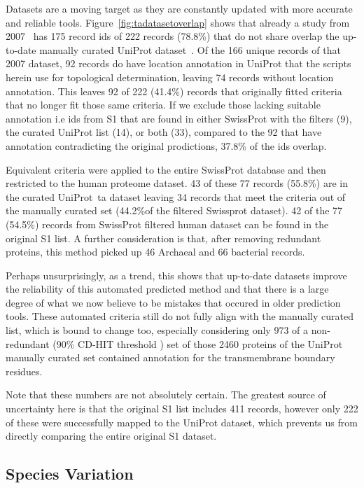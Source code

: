 Datasets are a moving target as they are constantly updated with more accurate and reliable tools.
Figure~\ref{fig:tadatasetoverlap} shows that already a study from 2007~\cite{Kalbfleisch2007} has 175 record ids of 222 records (78.8\%) that do not share overlap the up-to-date manually curated UniProt dataset~\cite{TheUniProtConsortium2014}.
Of the 166 unique records of that 2007 dataset, 92 records do have location annotation in UniProt that the scripts herein use for topological determination, leaving 74 records without location annotation.
This leaves 92 of 222 (41.4\%) records that originally fitted criteria that no longer fit those same criteria.
If we exclude those lacking suitable annotation i.e ids from S1 that are found in either SwissProt with the filters (9), the curated UniProt list (14), or both (33), compared to the 92 that have annotation contradicting the original prodictions, 37.8\% of the ids overlap.

Equivalent criteria were applied to the entire SwissProt database and then restricted to the human proteome dataset.
43 of these 77 records (55.8\%) are in the curated UniProt~\gls{ta}  dataset leaving 34 records that meet the criteria out of the manually curated set (44.2\%of the filtered Swissprot dataset).
42 of the 77 (54.5\%) records from SwissProt filtered human dataset can be found in the original S1 list.
A further consideration is that, after removing redundant proteins, this method picked up  46 Archaeal and 66 bacterial records.

Perhaps unsurprisingly, as a trend, this shows that up-to-date datasets improve the reliability of this automated predicted method and that there is a large degree of what we now believe to be mistakes that occured in older prediction tools.
These automated criteria still do not fully align with the manually curated list, which is bound to change too, especially considering only 973 of a non-redundant (90\% CD-HIT threshold \cite{Huang2010, Wu2011}) set of those 2460 proteins of the UniProt manually curated set contained annotation for the transmembrane boundary residues.

Note that these numbers are not absolutely certain.
The greatest source of uncertainty here is that the original S1 list includes 411 records, however only 222 of these were successfully mapped to the UniProt dataset, which prevents us from directly comparing the entire original S1 dataset.

\subsection{Species Variation}

